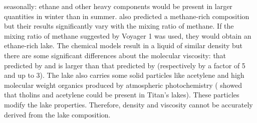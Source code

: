 seasonally: ethane and other heavy components would be present in larger quantities in winter than in summer. \citet{glein2013geochemical} also predicted a methane-rich composition but their results significantly vary with the mixing ratio of methane. If the mixing ratio of methane suggested by Voyager 1 was used, they would obtain an ethane-rich lake. The chemical models result in a liquid of similar density but there are some significant differences about the molecular viscosity: that predicted by \citet{cordier2009estimate} and \citet{luspay2015experimental} is larger than that predicted by \citet{tan2013titan} (respectively by a factor of 5 and up to 3). The lake also carries some solid particles like acetylene and high molecular weight organics produced by atmospheric photochemistry \citep[see e.g.][]{lorenz2010threshold, lorenz2011cyanide, lorenz2013oceanography} (\citet{tan2013titan} showed that tholins and acetylene could be present in Titan's lakes). These particles modify the lake properties. Therefore, density and viscosity cannot be accurately derived from the lake composition. 



